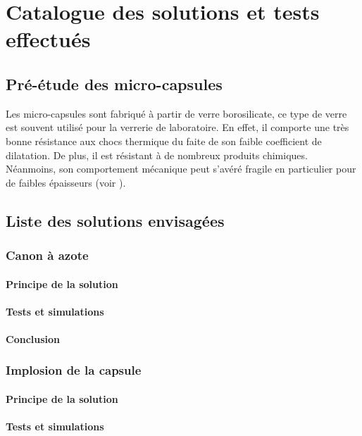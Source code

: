 \section{Catalogue des solutions et tests effectués}
\subsection{Pré-étude des micro-capsules}

Les micro-capsules sont fabriqué à partir de verre borosilicate, ce type 
de verre est souvent utilisé pour la verrerie de laboratoire. En effet, il comporte une 
très bonne résistance aux chocs thermique du faite de son faible coefficient de dilatation. 
De plus, il est résistant à de nombreux produits chimiques.
Néanmoins, son comportement mécanique peut s'avéré fragile en particulier pour de faibles
épaisseurs (voir \cite{report_borosilicate}).


\subsection{Liste des solutions envisagées}
\subsubsection{Canon à azote}
\paragraph{Principe de la solution}

\paragraph{Tests et simulations}

\paragraph{Conclusion}

\subsubsection{Implosion de la capsule}
\paragraph{Principe de la solution}

\paragraph{Tests et simulations}

